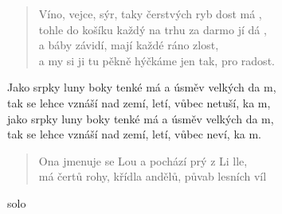 \begin{song}{}
\begin{verse}
   Víno, vejce, sýr, taky čerstvých ryb dost má , \\
   tohle do košíku každý na trhu za darmo jí dá , \\
   a báby závidí, mají každé ráno zlost, \\
   a my si ji tu pěkně hýčkáme jen tak, pro radost.
\end{verse}
\begin{refren}
   Jako srpky luny boky tenké má a úsměv velkých da m, \\
   tak se lehce vznáší nad zemí, letí, vůbec netuší, ka m, \\ 
   jako srpky luny boky tenké má a úsměv velkých da m, \\
   tak se lehce vznáší nad zemí, letí, vůbec neví, ka m.
\end{refren}
\begin{verse}
   Ona jmenuje se Lou a pochází prý z Li lle, \\
   má čertů rohy, křídla andělů, půvab lesních víl 
\end{verse}
\begin{optional}{solo}
                
\end{optional}


\end{song}
